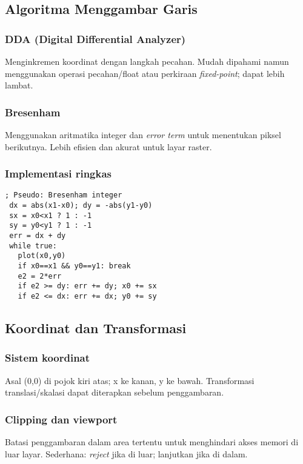 \subsection{Algoritma Menggambar Garis}
\subsubsection{DDA (Digital Differential Analyzer)}
Menginkremen koordinat dengan langkah pecahan. Mudah dipahami namun menggunakan operasi pecahan/float atau perkiraan \textit{fixed-point}; dapat lebih lambat.

\subsubsection{Bresenham}
Menggunakan aritmatika integer dan \textit{error term} untuk menentukan piksel berikutnya. Lebih efisien dan akurat untuk layar raster.

\subsubsection{Implementasi ringkas}
\begin{verbatim}
; Pseudo: Bresenham integer
 dx = abs(x1-x0); dy = -abs(y1-y0)
 sx = x0<x1 ? 1 : -1
 sy = y0<y1 ? 1 : -1
 err = dx + dy
 while true:
   plot(x0,y0)
   if x0==x1 && y0==y1: break
   e2 = 2*err
   if e2 >= dy: err += dy; x0 += sx
   if e2 <= dx: err += dx; y0 += sy
\end{verbatim}

\subsection{Koordinat dan Transformasi}
\subsubsection{Sistem koordinat}
Asal (0,0) di pojok kiri atas; x ke kanan, y ke bawah. Transformasi translasi/skalasi dapat diterapkan sebelum penggambaran.

\subsubsection{Clipping dan viewport}
Batasi penggambaran dalam area tertentu untuk menghindari akses memori di luar layar. Sederhana: \textit{reject} jika di luar; lanjutkan jika di dalam.

